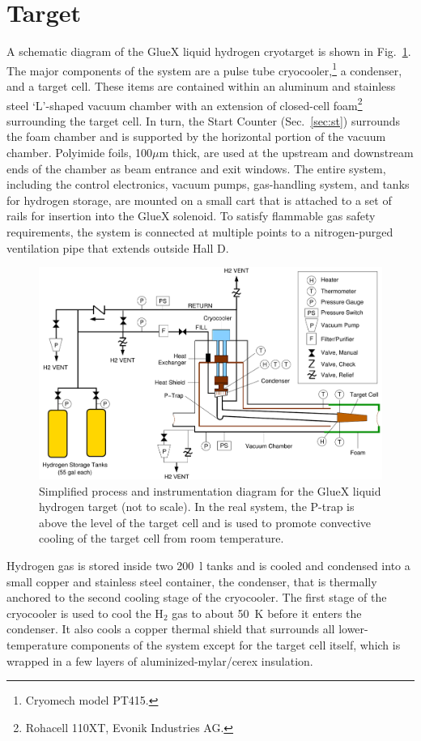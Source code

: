 \section[Target]{Target \label{sec:target} }
A schematic diagram of the GlueX liquid hydrogen cryotarget is shown in Fig.~\ref{fig:Target}. The major components of the system are a pulse tube cryocooler,\footnote{Cryomech model PT415.} a condenser, and a target cell.  These items are contained within an aluminum and stainless steel `L'-shaped vacuum chamber with an extension of closed-cell foam\footnote{Rohacell 110XT, Evonik Industries AG.} surrounding the target cell. In turn, the \gx{} Start Counter (Sec.~\ref{sec:st}) surrounds the foam chamber and is supported by the horizontal portion of the vacuum chamber. Polyimide foils, 100$\mu$m thick, are used at the upstream and downstream ends of the chamber as beam entrance and exit windows. The entire system, including the control electronics, vacuum pumps, gas-handling system, and tanks for hydrogen storage, are mounted on a small cart that is attached to a set of rails for insertion into the GlueX solenoid.  To satisfy flammable gas safety requirements, the system is connected at multiple points to a nitrogen-purged ventilation pipe that extends outside Hall D.
\begin{figure}
\begin{center}
\includegraphics[width=4.5in]{figures/TargetSchematic3.pdf}
\end{center}
\caption{Simplified process and instrumentation diagram for the GlueX liquid hydrogen target (not to scale).
In the real system, the P-trap is above the level of the target cell and is used to
promote convective cooling of the target cell from room temperature.}
\label{fig:Target}
\end{figure}

Hydrogen gas is stored inside two 200~l tanks and
is cooled and condensed into a small copper and stainless steel container,
the condenser, that is thermally anchored to the second cooling stage of the cryocooler. 
The first stage of the cryocooler is used to
cool the H$_2$ gas to about 50~K before it enters the condenser.
It also cools a copper thermal shield that surrounds all
lower-temperature components of the system except for the
target cell itself, which is wrapped in a few layers of aluminized-mylar/cerex insulation.

